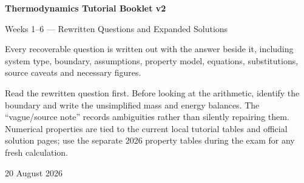 \documentclass[10pt,a4paper]{article}
\begin{document}
\begin{titlepage}\centering\vspace*{24mm}
{\Huge\bfseries Thermodynamics Tutorial Booklet v2\par}\vspace{5mm}
{\Large Weeks 1--6 --- Rewritten Questions and Expanded Solutions\par}\vspace{11mm}
{\large Every recoverable question is written out with the answer beside it, including system type, boundary, assumptions, property model, equations, substitutions, source caveats and necessary figures.\par}
\vfill
\begin{method}
Read the rewritten question first. Before looking at the arithmetic, identify the boundary and write the unsimplified mass and energy balances. The ``vague/source note'' records ambiguities rather than silently repairing them. Numerical properties are tied to the current local tutorial tables and official solution pages; use the separate 2026 property tables during the exam for any fresh calculation.
\end{method}
\vfill 20 August 2026
\end{titlepage}
\tableofcontents\newpage
\end{document}
